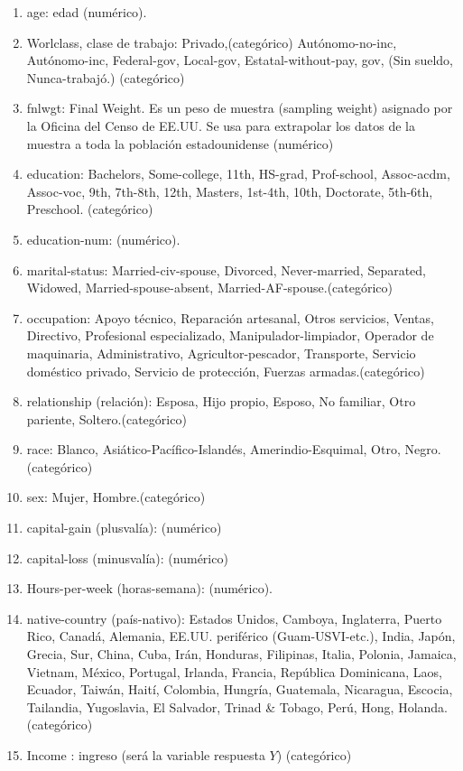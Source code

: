 \documentclass{article}
\begin{document}
	\begin{enumerate}
		\item age: edad (numérico).
		\item Worlclass, clase de trabajo: Privado,(categórico) Autónomo-no-inc, Autónomo-inc, Federal-gov, Local-gov, Estatal-without-pay, gov, (Sin sueldo, Nunca-trabajó.) (categórico)
		\item fnlwgt: Final Weight. Es un peso de muestra (sampling weight) asignado por la Oficina del Censo de EE.UU. Se usa para extrapolar los datos de la muestra a toda la población estadounidense (numérico)
		\item education: Bachelors, Some-college, 11th, HS-grad, Prof-school, Assoc-acdm, Assoc-voc, 9th, 7th-8th, 12th, Masters, 1st-4th, 10th, Doctorate, 5th-6th, Preschool. (categórico)
		\item education-num: (numérico).
		\item marital-status: Married-civ-spouse, Divorced, Never-married, Separated, Widowed, Married-spouse-absent, Married-AF-spouse.(categórico)
		\item occupation: Apoyo técnico, Reparación artesanal, Otros servicios, Ventas, Directivo, Profesional especializado, Manipulador-limpiador, Operador de maquinaria, Administrativo, Agricultor-pescador, Transporte, Servicio doméstico privado, Servicio de protección, Fuerzas armadas.(categórico)
		\item relationship (relación): Esposa, Hijo propio, Esposo, No familiar, Otro pariente, Soltero.(categórico)
		\item race: Blanco, Asiático-Pacífico-Islandés, Amerindio-Esquimal, Otro, Negro.(categórico)
		\item sex: Mujer, Hombre.(categórico)
		\item capital-gain (plusvalía): (numérico)
		\item capital-loss (minusvalía): (numérico)
		\item Hours-per-week (horas-semana): (numérico).
		\item native-country (país-nativo): Estados Unidos, Camboya, Inglaterra, Puerto Rico, Canadá, Alemania, EE.UU. periférico (Guam-USVI-etc.), India, Japón, Grecia, Sur, China, Cuba, Irán, Honduras, Filipinas, Italia, Polonia, Jamaica, Vietnam, México, Portugal, Irlanda, Francia, República Dominicana, Laos, Ecuador, Taiwán, Haití, Colombia, Hungría, Guatemala, Nicaragua, Escocia, Tailandia, Yugoslavia, El Salvador, Trinad \& Tobago, Perú, Hong, Holanda. (categórico)
		\item Income : ingreso (será la variable respuesta $Y$) (categórico)
		
	\end{enumerate}
	
\end{document}
